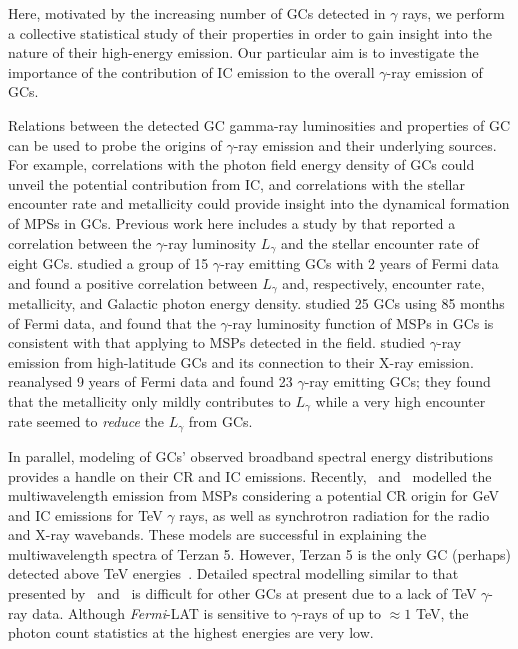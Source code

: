 \documentclass[doublespace,draft,nopageskip]{VTthesis} %
\begin{document}
Here, motivated by the increasing number of GCs detected in $\gamma$ rays, we perform a collective statistical study of their properties in order to gain insight into the nature of their high-energy emission. Our particular aim is to investigate the importance of the contribution of IC emission to the overall $\gamma$-ray emission of GCs.

Relations between the detected GC gamma-ray luminosities and properties of GC can be used to probe the origins of $\gamma$-ray emission and their underlying sources. For example, correlations with the photon field energy density of GCs could unveil the potential contribution from IC, and correlations with the stellar encounter rate and metallicity could provide insight into the dynamical formation of MPSs in GCs. Previous work here includes a study by \citet{2010A&A...524A..75A} that reported a correlation between the $\gamma$-ray luminosity $L_\gamma$ and the stellar encounter rate of eight GCs. \citet{2011ApJ...726..100H} studied a group of 15 $\gamma$-ray emitting GCs with 2 years of Fermi data and found a positive correlation between $L_\gamma$ and, respectively, encounter rate, metallicity, and Galactic photon energy density. \citet{2016JCAP...08..018H} studied 25 GCs using 85 months of Fermi data, and found that the $\gamma$-ray luminosity function of MSPs in GCs is consistent with that applying to MSPs detected in the field. \citet{2018MNRAS.480.4782L} studied $\gamma$-ray emission from high-latitude GCs and its connection to their X-ray emission. \citet{2019MNRAS.486..851D} reanalysed 9 years of Fermi data and found 23 $\gamma$-ray emitting GCs; they found that the metallicity only mildly contributes to $L_\gamma$ while a very high encounter rate seemed to {\it reduce} the $L_\gamma$ from GCs.

In parallel, modeling of GCs' observed broadband spectral energy distributions provides a handle on their CR and IC emissions. Recently,~\citet{2013ApJ...779..126K} and~\citet{2019ApJ...880...53N} modelled the multiwavelength emission from MSPs considering a potential CR origin for GeV and IC emissions for TeV $\gamma$ rays, as well as synchrotron radiation for the radio and X-ray wavebands. These models are successful in explaining the multiwavelength spectra of Terzan 5. However, Terzan 5 is the only GC (perhaps) detected above TeV energies~\citep{2011A&A...531L..18H}. Detailed spectral modelling similar to that presented by~\citet{2013ApJ...779..126K} and~\citet{2019ApJ...880...53N} is difficult for other GCs at present due to a lack of TeV $\gamma$-ray data. Although \textit{Fermi}-LAT is sensitive to $\gamma$-rays of up to $\approx 1$ TeV, the photon count statistics at the highest energies are very low.
\end{document}
